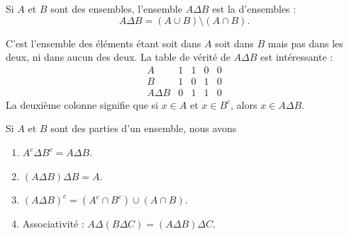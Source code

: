 \begin{definition}    \label{DefBMLooVjlSG}
    Si \( A\) et \( B\) sont des ensembles, l'ensemble \( A\Delta B\) est la  d'ensembles :
    \begin{equation}
        A\Delta B=(A\cup B)\setminus(A\cap B).
    \end{equation}
\end{definition}
C'est l'ensemble des éléments étant soit dans \( A\) soit dans \( B\) mais pas dans les deux, ni dans aucun des deux. La table de vérité de \( A\Delta B\) est intéressante :
\begin{equation}        \label{EQooOJBOooKkKbYp}
    \begin{array}{|c|c|c|c|c|}
        \hline%
        A   &   1   & 1 & 0 & 0\\
        \hline%
        B&1&0&1&0\\
        \hline%
      A\Delta B&0&1&1&0  
    \end{array}
\end{equation}
La deuxième colonne signifie que si \( x\in A\) et \( x\in B^c\), alors \( x\in A\Delta B\).

\begin{lemma}   \label{LemCUVoohKpWB}
    Si \( A\) et \( B\) sont des parties d'un ensemble, nous avons
    \begin{enumerate}
        \item\label{ItemVUCooHAztC}
            \( A^c\Delta B^c=A\Delta B\).
        \item\label{ItemVUCooHAztCii}
            \( (A\Delta B)\Delta B=A\).
        \item       \label{ITEMooSPZXooPTgisP}
            \( (A\Delta B)^c=(A^c\cap B^c)\cup(A\cap B)\).
        \item       \label{ITEMooSMXWooYcWsRC}
            Associativité : \( A\Delta (B\Delta C)=(A\Delta B)\Delta C\).
    \end{enumerate}
\end{lemma}

